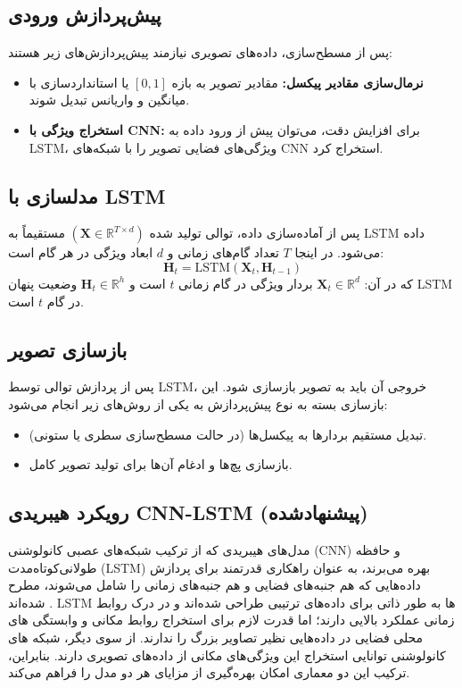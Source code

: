 \subsection{پیش‌پردازش ورودی}

پس از مسطح‌سازی، داده‌های تصویری نیازمند پیش‌پردازش‌های زیر هستند:
\begin{itemize}
	\item \textbf{نرمال‌سازی مقادیر پیکسل:} مقادیر تصویر به بازه \([0, 1]\) یا استانداردسازی با میانگین و واریانس تبدیل شوند.
	\item \textbf{استخراج ویژگی با CNN:} برای افزایش دقت، می‌توان پیش از ورود داده به LSTM، ویژگی‌های فضایی تصویر را با شبکه‌های CNN استخراج کرد.
\end{itemize}

\subsection{مدلسازی با LSTM}

پس از آماده‌سازی داده، توالی تولید شده \((\mathbf{X} \in \mathbb{R}^{T \times d})\) مستقیماً به LSTM داده می‌شود. در اینجا \(T\) تعداد گام‌های زمانی و \(d\) ابعاد ویژگی در هر گام است:
$$
\mathbf{H}_t = \textrm{LSTM}(\mathbf{X}_t, \mathbf{H}_{t-1})
$$
که در آن:
\(\mathbf{X}_t \in \mathbb{R}^d\)
بردار ویژگی در گام زمانی $t$ است و
\(\mathbf{H}_t \in \mathbb{R}^h\)
وضعیت پنهان LSTM در گام $t$ است.

\subsection{بازسازی تصویر}

پس از پردازش توالی توسط LSTM، خروجی آن باید به تصویر بازسازی شود. این بازسازی بسته به نوع پیش‌پردازش به یکی از روش‌های زیر انجام می‌شود:
\begin{itemize}
	\item تبدیل مستقیم بردارها به پیکسل‌ها (در حالت مسطح‌سازی سطری یا ستونی).
	\item بازسازی پچ‌ها و ادغام آن‌ها برای تولید تصویر کامل.
\end{itemize}

\subsection{رویکرد هیبریدی CNN-LSTM (پیشنهادشده)}
مدل‌های هیبریدی که از ترکیب شبکه‌های عصبی کانولوشنی (CNN) و حافظه طولانی‌کوتاه‌مدت (LSTM) بهره می‌برند، به عنوان راهکاری قدرتمند برای پردازش داده‌هایی که هم جنبه‌های فضایی و هم جنبه‌های زمانی را شامل می‌شوند، مطرح شده‌اند
\cite{shiConvolutionalLSTMNetwork2015}.
LSTM
 ها به طور ذاتی برای داده‌های ترتیبی طراحی شده‌اند و در درک روابط زمانی عملکرد بالایی دارند؛ اما قدرت لازم برای استخراج روابط مکانی و وابستگی های محلی فضایی در داده‌هایی نظیر تصاویر بزرگ را ندارند. از سوی دیگر، شبکه های کانولوشنی توانایی استخراج این ویژگی‌های مکانی از داده‌های تصویری دارند. بنابراین، ترکیب این دو معماری امکان بهره‌گیری از مزایای هر دو مدل را فراهم می‌کند.

